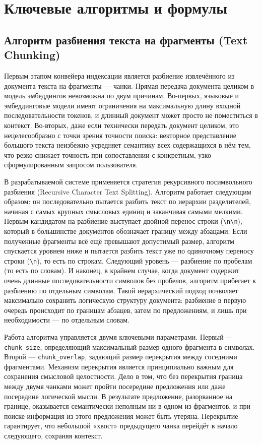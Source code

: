 
\section{Ключевые алгоритмы и формулы}

\subsection{Алгоритм разбиения текста на фрагменты (Text Chunking)}

Первым этапом конвейера индексации является разбиение извлечённого из документа текста на фрагменты — чанки. Прямая передача документа целиком в модель эмбеддингов невозможна по двум причинам. Во-первых, языковые и эмбеддинговые модели имеют ограничения на максимальную длину входной последовательности токенов, и длинный документ может просто не поместиться в контекст. Во-вторых, даже если технически передать документ целиком, это нецелесообразно с точки зрения точности поиска: векторное представление большого текста неизбежно усредняет семантику всех содержащихся в нём тем, что резко снижает точность при сопоставлении с конкретным, узко сформулированным запросом пользователя.

В разрабатываемой системе применяется стратегия рекурсивного посимвольного разбиения (Recursive Character Text Splitting). Алгоритм работает следующим образом: он последовательно пытается разбить текст по иерархии разделителей, начиная с самых крупных смысловых единиц и заканчивая самыми мелкими. Первым кандидатом на разбиение выступает двойной перенос строки (\texttt{\textbackslash n\textbackslash n}), который в большинстве документов обозначает границу между абзацами. Если полученные фрагменты всё ещё превышают допустимый размер, алгоритм спускается уровнем ниже и пытается разбить текст уже по одиночному переносу строки (\texttt{\textbackslash n}), то есть по строкам. Следующий уровень — разбиение по пробелам (то есть по словам). И наконец, в крайнем случае, когда документ содержит очень длинные последовательности символов без пробелов, алгоритм прибегает к разбиению по отдельным символам. Такой иерархический подход позволяет максимально сохранить логическую структуру документа: разбиение в первую очередь происходит по границам абзацев, затем по предложениям, и лишь при необходимости — по отдельным словам.

Работа алгоритма управляется двумя ключевыми параметрами. Первый — \texttt{chunk\_size}, определяющий максимальный размер одного фрагмента в символах. Второй — \texttt{chunk\_overlap}, задающий размер перекрытия между соседними фрагментами. Механизм перекрытия является принципиально важным для сохранения смысловой целостности. Дело в том, что без перекрытия граница между двумя чанками может пройти посередине предложения или даже посередине логической мысли. В результате предложение, разорванное на границе, оказывается семантически неполным ни в одном из фрагментов, и при поиске информация из этого предложения может быть утеряна. Перекрытие гарантирует, что небольшой «хвост» предыдущего чанка перейдёт в начало следующего, сохраняя контекст.

